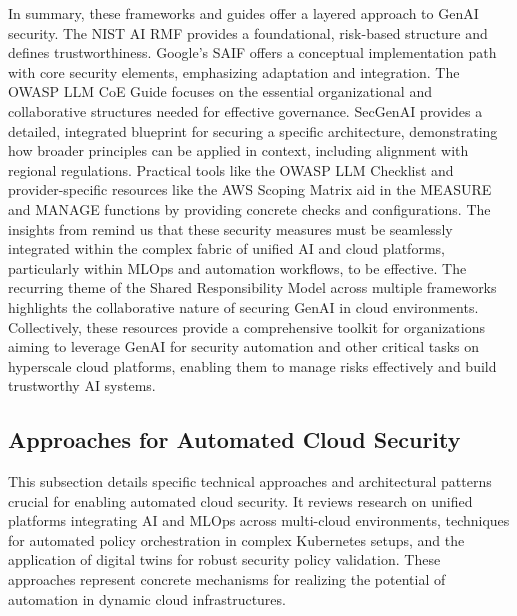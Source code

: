 In summary, these frameworks and guides offer a layered approach to GenAI security. The NIST AI RMF provides a foundational, risk-based structure and defines trustworthiness. Google's SAIF offers a conceptual implementation path with core security elements, emphasizing adaptation and integration. The OWASP LLM CoE Guide focuses on the essential organizational and collaborative structures needed for effective governance. SecGenAI provides a detailed, integrated blueprint for securing a specific architecture, demonstrating how broader principles can be applied in context, including alignment with regional regulations. Practical tools like the OWASP LLM Checklist and provider-specific resources like the AWS Scoping Matrix aid in the MEASURE and MANAGE functions by providing concrete checks and configurations. The insights from \cite{sushil_prabhu_prabhakaran_integration_2024} remind us that these security measures must be seamlessly integrated within the complex fabric of unified AI and cloud platforms, particularly within MLOps and automation workflows, to be effective. The recurring theme of the Shared Responsibility Model across multiple frameworks \cite{tabassi_artificial_2023, hansen_introducing_2023, haryanto_secgenai_2024, OWASP:2024:LLMChecklist} highlights the collaborative nature of securing GenAI in cloud environments. Collectively, these resources provide a comprehensive toolkit for organizations aiming to leverage GenAI for security automation and other critical tasks on hyperscale cloud platforms, enabling them to manage risks effectively and build trustworthy AI systems.

\subsection{Approaches for Automated Cloud Security} %
\label{sec:Approaches for Automated Cloud Security}

This subsection details specific technical approaches and architectural patterns crucial for enabling automated cloud security. It reviews research on unified platforms integrating AI and MLOps across multi-cloud environments, techniques for automated policy orchestration in complex Kubernetes setups, and the application of digital twins for robust security policy validation. These approaches represent concrete mechanisms for realizing the potential of automation in dynamic cloud infrastructures.

